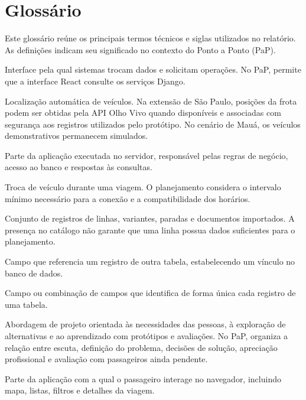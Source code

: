 \documentclass[12pt,oneside,a4paper,brazil,chapter=TITLE]{abntex2}
\begin{document}
\chapter*{Glossário}
\label{sec:glossario}
Este glossário reúne os principais termos técnicos e siglas utilizados no relatório. As definições indicam seu significado no contexto do Ponto a Ponto (PaP).

\begin{description}[style=nextline,leftmargin=0pt,labelwidth=0pt,font=\bfseries,itemsep=0.5\baselineskip]
\item[API (Application Programming Interface)] Interface pela qual sistemas trocam dados e solicitam operações. No PaP, permite que a interface React consulte os serviços Django.
\item[AVL (Automatic Vehicle Location)] Localização automática de veículos. Na extensão de São Paulo, posições da frota podem ser obtidas pela API Olho Vivo quando disponíveis e associadas com segurança aos registros utilizados pelo protótipo. No cenário de Mauá, os veículos demonstrativos permanecem simulados.
\item[Backend] Parte da aplicação executada no servidor, responsável pelas regras de negócio, acesso ao banco e respostas às consultas.
\item[Baldeação] Troca de veículo durante uma viagem. O planejamento considera o intervalo mínimo necessário para a conexão e a compatibilidade dos horários.
\item[Catálogo] Conjunto de registros de linhas, variantes, paradas e documentos importados. A presença no catálogo não garante que uma linha possua dados suficientes para o planejamento.
\item[Chave estrangeira (FK, Foreign Key)] Campo que referencia um registro de outra tabela, estabelecendo um vínculo no banco de dados.
\item[Chave primária (PK, Primary Key)] Campo ou combinação de campos que identifica de forma única cada registro de uma tabela.
\item[Design Thinking] Abordagem de projeto orientada às necessidades das pessoas, à exploração de alternativas e ao aprendizado com protótipos e avaliações. No PaP, organiza a relação entre escuta, definição do problema, decisões de solução, apreciação profissional e avaliação com passageiros ainda pendente.
\item[Frontend] Parte da aplicação com a qual o passageiro interage no navegador, incluindo mapa, listas, filtros e detalhes da viagem.

\end{description}
\end{document}

